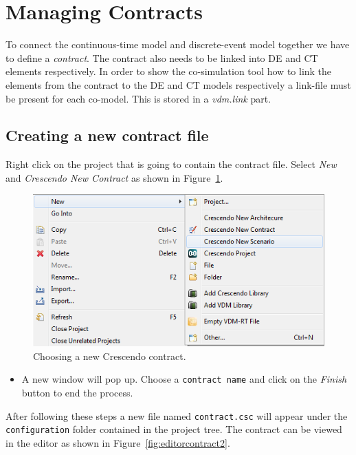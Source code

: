 \documentclass{crescendorepchap}
\begin{document}

\section{Managing Contracts}\label{sec:contract}

To connect the continuous-time model and discrete-event model together
we have to define a \emph{contract}. The contract also needs to be linked
into DE and CT elements respectively.
In order to show the co-simulation tool how to link the elements from
the contract to the DE and CT models respectively a link-file must be
present for each co-model. This is stored in a \emph{vdm.link} part.

\subsection{Creating a new contract file}

Right click on the project that is going to contain the contract file.
Select \emph{New} and \emph{Crescendo New Contract} as shown in Figure~\ref{fig:newcontract}.

\begin{figure}[htbp]
\centering
\includegraphics[width=.6\textwidth]{images/DestecsNewContract.png}
\caption{Choosing a new Crescendo contract.\label{fig:newcontract}}
\end{figure}

\begin{itemize}
\item
  A new window will pop up. Choose a \texttt{contract name} and click on
  the \emph{Finish} button to end the process.
\end{itemize}

After following these steps a new file named \texttt{contract.csc} will
appear under the \texttt{configuration} folder contained in the project
tree. The contract can be viewed in the editor as shown in Figure~\ref{fig:editorcontract2}.
\end{document}
